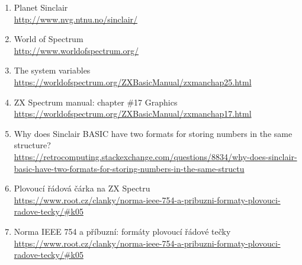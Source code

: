 \documentclass{article}
\begin{document}
\begin{enumerate}
\item
  Planet Sinclair\\
  \url{http://www.nvg.ntnu.no/sinclair/}
\item
  World of Spectrum\\
  \url{http://www.worldofspectrum.org/}
\item
  The system variables\\
  \href{https://worldofspectrum.org/ZXBasicManual/zxmanchap25.html}{https://worldofspectrum.or­g/ZXBasicManual/zxmanchap25­.html}
\item
  ZX Spectrum manual: chapter \#17 Graphics\\
  \href{https://worldofspectrum.org/ZXBasicManual/zxmanchap17.html}{https://worldofspectrum.or­g/ZXBasicManual/zxmanchap17­.html}
\item
  Why does Sinclair BASIC have two formats for storing numbers in the
  same structure?\\
  \href{https://retrocomputing.stackexchange.com/questions/8834/why-does-sinclair-basic-have-two-formats-for-storing-numbers-in-the-same-structu}{https://retrocomputing.stac­kexchange.com/questions/8834/why-does-sinclair-basic-have-two-formats-for-storing-numbers-in-the-same-structu}
\item
  Plovoucí řádová čárka na ZX Spectru\\
  \url{https://www.root.cz/clanky/norma-ieee-754-a-pribuzni-formaty-plovouci-radove-tecky/\#k05}
\item
  Norma IEEE 754 a příbuzní: formáty plovoucí řádové tečky\\
  \url{https://www.root.cz/clanky/norma-ieee-754-a-pribuzni-formaty-plovouci-radove-tecky/\#k05}
\end{enumerate}
\end{document}

